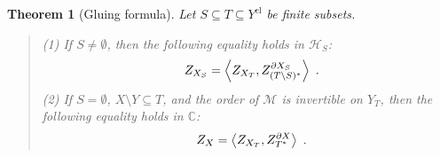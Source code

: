 \documentclass[a4paper]{amsart}
\newtheorem{thm}{Theorem}[section]
\theoremstyle{definition}
\numberwithin{equation}{section}
\begin{document}
\begin{thm}[Gluing formula] Let $S\subseteq T\subseteq Y^\mathrm{cl}$ be finite subsets.
\begin{quote}
    (1) If $S\neq\emptyset$, then the following equality holds in $\mathscr{H}_S$:
    \begin{align*}
        Z_{X_S}=\left\langle Z_{X_T},Z_{(T\setminus S)^\ast}^{\partial X_S}\right\rangle\rlap{\ .}
    \end{align*}
    (2) If $S=\emptyset$, $X\setminus Y\subseteq T$, and the order of $\mathcal{M}$ is invertible on $Y_T$, then the following equality holds in $\mathbb{C}$:
    \begin{align*}
        Z_X=\left\langle Z_{X_T},Z_{T^\ast}^{\partial X}\right\rangle\rlap{\ .}
    \end{align*}
\end{quote}
\end{thm}
\end{document}
